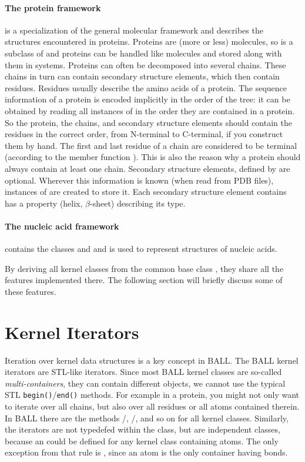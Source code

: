 \paragraph{The protein framework}is a specialization of the general molecular
framework and describes the structures encountered in proteins. Proteins are
(more or less) molecules, so  is a subclass of 
and proteins can be handled like molecules and stored along with them in
systems. Proteins can often be decomposed into several chains. These chains in
turn can contain secondary structure elements, which then contain residues.
Residues usually describe the amino acids of a protein. The sequence
information of a protein is encoded implicitly in the order of the tree: it
can be obtained by reading all instances of  in the order they
are contained in a protein. So the protein, the chains, and secondary
structure elements should contain the residues in the correct order, from
N-terminal to C-terminal, if you construct them by hand. The first and last
residue of a chain are considered to be terminal (according to the member
function ). This is also the reason why a protein
should always contain at least one chain. Secondary structure elements,
defined by  are optional. Wherever this information
is known (\eg when read from PDB files), instances of
 are created to store it. Each secondary structure
element contains has a property (\eg helix, $\beta$-sheet) describing its type.

\paragraph{The nucleic acid framework}contains the classes 
and  and is used to represent structures of nucleic acids.

By deriving all kernel classes from the common base class ,
they share all the features implemented there. The following section will
briefly discuss some of these features.

\section{Kernel Iterators}
Iteration over kernel data structures is a key concept in BALL.
The BALL kernel iterators are STL-like iterators. Since most BALL kernel
classes are so-called {\em multi-containers}, \ie they can contain different
objects, we cannot use the typical STL {\tt begin()}/{\tt end()} methods.
For example in a protein, you might not only want to iterate over all chains,
but also over all residues or all atoms contained therein. In BALL there
are the methods /,
/, and so on for all
kernel classes. Similarly, the iterators are not typedefed within the class,
but are independent classes, because an  could be defined
for any kernel class containing atoms. The only exception from that rule
is , since an atom is the only container having
bonds.

